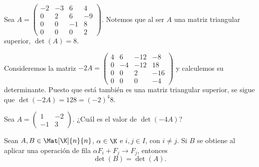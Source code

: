 \documentclass[compacto,10pt]{pubciencias-notas}
\begin{document}
\begin{ejem}
    Sea $A =
    \begin{pmatrix}
        -2 & -3 & 6 & 4 \\
        0 & 2 & 6 & -9 \\
        0 & 0 & -1 & 8 \\
        0 & 0 & 0 & 2
    \end{pmatrix}$. Notemos que al ser $A$ una matriz triangular superior, $\det(A) = 8$.
    
    \noindent Consideremos la matriz $-2A = 
    \begin{pmatrix}
        4 & 6 & -12 & -8 \\
        0 & -4 & -12 & 18 \\
        0 & 0 & 2 & -16 \\
        0 & 0 & 0 & -4
    \end{pmatrix}$ y calculemos su determinante. Puesto que está también es una matriz triangular superior, se sigue que $\det(-2A) = 128 = (-2)^{4}8$.
\end{ejem}

\begin{ejer}
    Sea $A = 
    \begin{pmatrix}
        1 & -2 \\
        -1 & 3
    \end{pmatrix}$. ¿Cuál es el valor de $\det(-4A)$?
\end{ejer}

\begin{prop}
    Sean $A, B \in \Mat[\K]{n}{n}$, $\alpha\in\K$ e $i,j\in I$, con $i\neq j$. Si $B$ se obtiene al aplicar una operación de fila $\alpha F_i + F_j \to F_j$, entonces 
    \[
        \det(B) = \det(A).
    \]
\end{prop}

\end{document}
